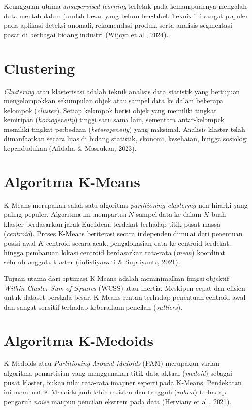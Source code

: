 \documentclass[a4paper,oneside,12pt]{report}
\begin{document}
Keunggulan utama \textit{unsupervised learning} terletak pada kemampuannya mengolah data mentah dalam jumlah besar yang belum ber-label. Teknik ini sangat populer pada aplikasi deteksi anomali, rekomendasi produk, serta analisis segmentasi pasar di berbagai bidang industri (Wijoyo et al., 2024).

\section{Clustering}
\textit{Clustering} atau klasterisasi adalah teknik analisis data statistik yang bertujuan mengelompokkan sekumpulan objek atau sampel data ke dalam beberapa kelompok (\textit{cluster}). Setiap kelompok berisi objek yang memiliki tingkat kemiripan (\textit{homogeneity}) tinggi satu sama lain, sementara antar-kelompok memiliki tingkat perbedaan (\textit{heterogeneity}) yang maksimal. Analisis klaster telah dimanfaatkan secara luas di bidang statistik, ekonomi, kesehatan, hingga sosiologi kependudukan (Afidaha \& Masrukan, 2023).

\section{Algoritma K-Means}
K-Means merupakan salah satu algoritma \textit{partitioning clustering} non-hirarki yang paling populer. Algoritma ini mempartisi $N$ sampel data ke dalam $K$ buah klaster berdasarkan jarak Euclidean terdekat terhadap titik pusat massa (\textit{centroid}). Proses K-Means beriterasi secara independen dimulai dari penentuan posisi awal $K$ centroid secara acak, pengalokasian data ke centroid terdekat, hingga pembaruan lokasi centroid berdasarkan rata-rata (\textit{mean}) koordinat seluruh anggota klaster (Sulistiyawati \& Supriyanto, 2021).

Tujuan utama dari optimasi K-Means adalah meminimalkan fungsi objektif \textit{Within-Cluster Sum of Squares} (WCSS) atau Inertia. Meskipun cepat dan efisien untuk dataset berskala besar, K-Means rentan terhadap penentuan centroid awal dan sangat sensitif terhadap keberadaan pencilan (\textit{outliers}).

\section{Algoritma K-Medoids}
K-Medoids atau \textit{Partitioning Around Medoids} (PAM) merupakan varian algoritma pemartisian yang menggunakan titik data aktual (\textit{medoid}) sebagai pusat klaster, bukan nilai rata-rata imajiner seperti pada K-Means. Pendekatan ini membuat K-Medoids jauh lebih resisten dan tangguh (\textit{robust}) terhadap pengaruh \textit{noise} maupun pencilan ekstrem pada data (Herviany et al., 2021).
\end{document}
